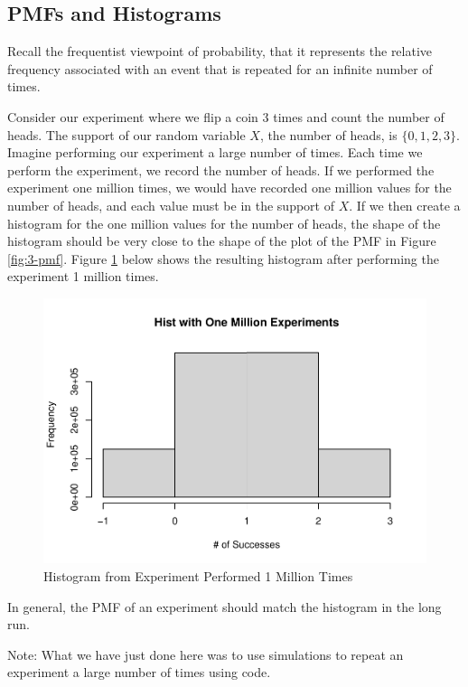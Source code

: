\documentclass[
]{book}
\begin{document}
\subsection{PMFs and Histograms}\label{pmfhist}

Recall the frequentist viewpoint of probability, that it represents the relative frequency associated with an event that is repeated for an infinite number of times.

Consider our experiment where we flip a coin 3 times and count the number of heads. The support of our random variable \(X\), the number of heads, is \(\{0,1,2,3 \}\). Imagine performing our experiment a large number of times. Each time we perform the experiment, we record the number of heads. If we performed the experiment one million times, we would have recorded one million values for the number of heads, and each value must be in the support of \(X\). If we then create a histogram for the one million values for the number of heads, the shape of the histogram should be very close to the shape of the plot of the PMF in Figure \ref{fig:3-pmf}. Figure \ref{fig:3-sim} below shows the resulting histogram after performing the experiment 1 million times.

\begin{figure}
\centering
\includegraphics{bookdown-demo_files/figure-latex/3-sim-1.pdf}
\caption{\label{fig:3-sim}Histogram from Experiment Performed 1 Million Times}
\end{figure}

In general, the PMF of an experiment should match the histogram in the long run.

Note: What we have just done here was to use simulations to repeat an experiment a large number of times using code.
\end{document}
